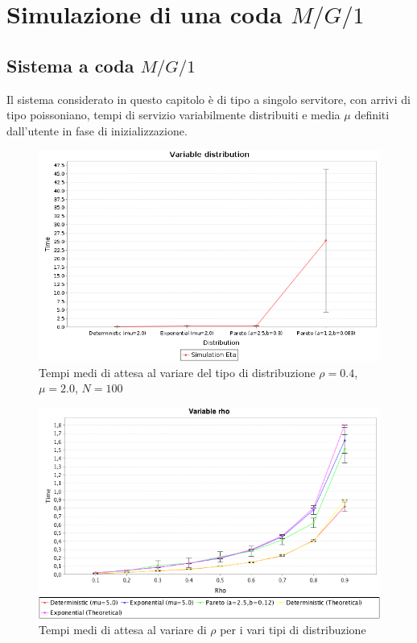\chapter{Simulazione di una coda $M/G/1$}
\label{ch:mg1}

\section{Sistema a coda $M/G/1$}

Il sistema considerato in questo capitolo \`e di tipo a singolo servitore, con arrivi di tipo poissoniano, tempi di servizio variabilmente distribuiti e media $\mu$ definiti dall'utente in fase di inizializzazione.

\begin{figure}[!h]{
	\begin{center}
	   \includegraphics[width=\textwidth]{figures/mg1dists.png}
	\end{center}}
	\caption{Tempi medi di attesa al variare del tipo di distribuzione $\rho=0.4$, $\mu=2.0$, $N=100$}
	\label{fig:mg1dists}
\end{figure}

\begin{figure}[!h]{
	\begin{center}
	   \includegraphics[width=\textwidth]{figures/cfrdists.png}
	\end{center}}
	\caption{Tempi medi di attesa al variare di $\rho$ per i vari tipi di distribuzione}
	\label{fig:cfrdists}
\end{figure}

